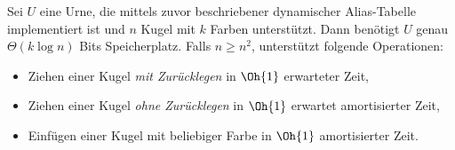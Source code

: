 \begin{theorem}
    Sei $U$ eine Urne, die mittels zuvor beschriebener dynamischer Alias-Tabelle implementiert ist und $n$ Kugel mit $k$ Farben unterstützt.
    Dann benötigt $U$ genau $\Theta(k \log n)$ Bits Speicherplatz.
    Falls $n \ge n^2$, unterstützt folgende Operationen:
    \begin{itemize}
        \item Ziehen einer Kugel \emph{mit Zurücklegen} in $\Oh{1}$ erwarteter Zeit,
        \item Ziehen einer Kugel \emph{ohne Zurücklegen} in $\Oh{1}$ erwartet amortisierter Zeit,
        \item Einfügen einer Kugel mit beliebiger Farbe in $\Oh{1}$ amortisierter Zeit.
    \end{itemize}
\end{theorem}

